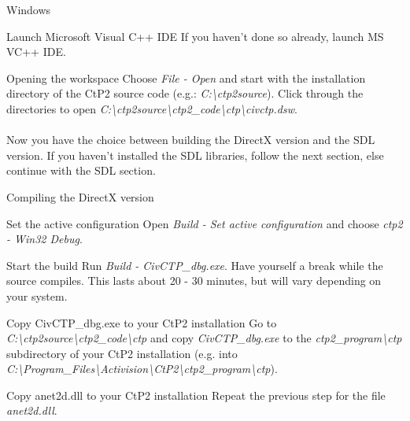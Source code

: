\begin{section}{Windows}
\begin{subsection}{Launch Microsoft Visual C++ IDE}
If you haven't done so already, launch MS VC++ IDE.
\end{subsection}%

\begin{subsection}{Opening the workspace}
Choose \textit{File - Open} and start with the installation directory of the CtP2 source code (e.g.: \textit{C:\textbackslash{}ctp2source}). Click through the directories to open \textit{C:\textbackslash{}ctp2source\textbackslash{}ctp2\_code\textbackslash{}ctp\textbackslash{}civctp.dsw}.\\
\\
Now you have the choice between building the DirectX version and the SDL version. If you haven't installed the SDL libraries, follow the next section, else continue with the SDL section.
\end{subsection}%

\begin{subsection}{Compiling the DirectX version}
\begin{subsubsection}{Set the active configuration}
Open \textit{Build - Set active configuration} and choose \textit{ctp2 - Win32 Debug}.
\end{subsubsection}%

\begin{subsubsection}{Start the build}
Run \textit{Build - CivCTP\_dbg.exe}. Have yourself a break while the source compiles. This lasts about 20 - 30 minutes, but will vary depending on your system.
\end{subsubsection}%

\begin{subsubsection}{Copy CivCTP\_dbg.exe to your CtP2 installation}
Go to \textit{C:\textbackslash{}ctp2source\textbackslash{}ctp2\_code\textbackslash{}ctp} and copy \textit{CivCTP\_dbg.exe} to the \textit{ctp2\_program\textbackslash{}ctp} subdirectory of your CtP2 installation (e.g. into \textit{C:\textbackslash{}Program\_Files\textbackslash{}Activision\textbackslash{}CtP2\textbackslash{}ctp2\_program\textbackslash{}ctp}).
\end{subsubsection}%

\begin{subsubsection}{Copy anet2d.dll to your CtP2 installation}
Repeat the previous step for the file \textit{anet2d.dll}.
\end{subsubsection}%


\end{subsection}
\end{section}
